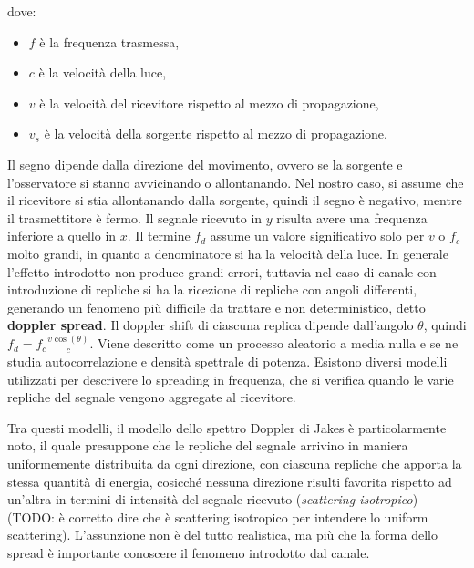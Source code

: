dove:
\begin{itemize}
    \item $f$ è la frequenza trasmessa,
    \item $c$ è la velocità della luce,
    \item $v$ è la velocità del ricevitore rispetto al mezzo di propagazione,
    \item $v_s$ è la velocità della sorgente rispetto al mezzo di propagazione.
\end{itemize}


Il segno dipende dalla direzione del movimento, ovvero se la sorgente e l'osservatore si stanno avvicinando o allontanando. 
Nel nostro caso, si assume che il ricevitore si stia allontanando dalla sorgente, quindi il segno è negativo, mentre il trasmettitore è fermo.
Il segnale ricevuto in $y$ risulta avere una frequenza inferiore a quello in $x$.
Il termine $f_d$ assume un valore significativo solo per $v$ o $f_c$ molto grandi, in quanto a denominatore si ha la velocità della luce.
In generale l'effetto introdotto non produce grandi errori, tuttavia nel caso di canale con introduzione di repliche si ha la ricezione di repliche con angoli differenti, generando un fenomeno più difficile da trattare e non deterministico, detto \textbf{doppler spread}.
Il doppler shift di ciascuna replica dipende dall'angolo $\theta$, quindi $f_d = f_c \frac{v \cos(\theta)}{c}$. 
Viene descritto come un processo aleatorio a media nulla e se ne studia autocorrelazione e densità spettrale di potenza.
Esistono diversi modelli utilizzati per descrivere lo spreading in frequenza,
che si verifica quando le varie repliche del segnale vengono aggregate al ricevitore.

Tra questi modelli, il modello dello spettro Doppler di Jakes è particolarmente noto, il quale presuppone che le repliche del segnale arrivino in maniera uniformemente distribuita da ogni direzione, con ciascuna repliche che apporta la stessa quantità di energia, cosicché nessuna direzione risulti favorita rispetto ad un'altra in termini di intensità del segnale ricevuto (\textit{scattering isotropico}) (TODO: è corretto dire che è scattering isotropico per intendere lo uniform scattering).
L'assunzione non è del tutto realistica, ma più che la forma dello spread è importante conoscere il fenomeno introdotto dal canale.

